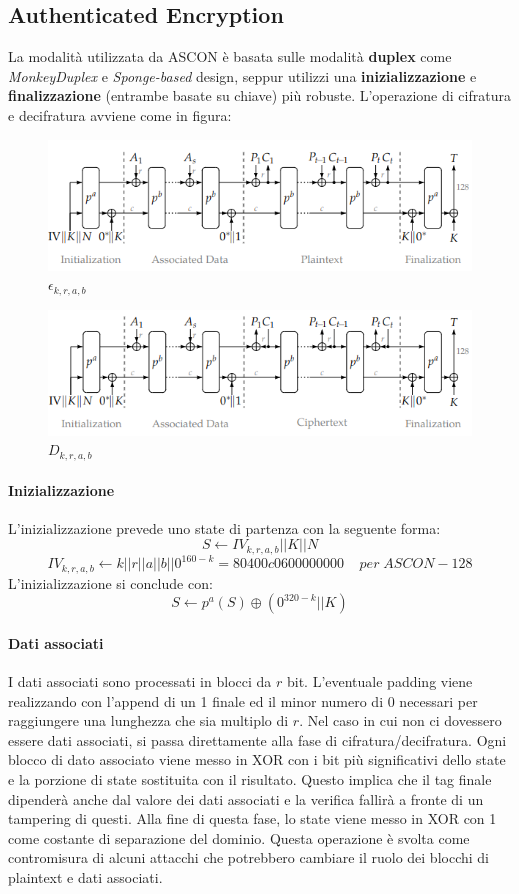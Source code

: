 \subsection{Authenticated Encryption}
La modalità utilizzata da ASCON è basata sulle modalità \textbf{duplex} come \textsl{MonkeyDuplex} e \textsl{Sponge-based} design, seppur utilizzi una \textbf{inizializzazione} e \textbf{finalizzazione} (entrambe basate su chiave) più robuste. L'operazione di cifratura e decifratura avviene come in figura: 
\begin{figure}[h!]
    \centering
    \includegraphics[width=12cm]{images/enc.png}
    \caption[short]{$\epsilon_{k,r,a,b}$}
\end{figure}
\begin{figure}[h!]
    \centering
    \includegraphics[width=12cm]{images/dec.png}
    \caption[short]{$D_{k,r,a,b}$}
\end{figure}
\paragraph*{Inizializzazione}
L'inizializzazione prevede uno state di partenza con la seguente forma: 
\[S \leftarrow IV_{k,r,a,b} || K || N\]
\[IV_{k,r,a,b} \leftarrow k || r || a || b || 0^{160-k} = 80400c0600000000\;\;\;\;per\;ASCON-128\]
L'inizializzazione si conclude con:
\[S\leftarrow p^a(S)\oplus (0^{320-k} || K)\]
\paragraph*{Dati associati}
I dati associati sono processati in blocci da $r$ bit. L'eventuale padding viene realizzando con l'append di un 1 finale ed il minor numero di 0 necessari per raggiungere una lunghezza che sia multiplo di $r$. Nel caso in cui non ci dovessero essere dati associati, si passa direttamente alla fase di cifratura/decifratura. Ogni blocco di dato associato viene messo in XOR con i bit più significativi dello state e la porzione di state sostituita con il risultato. Questo implica che il tag finale dipenderà anche dal valore dei dati associati e la verifica fallirà a fronte di un tampering di questi. 
\newline\newline
Alla fine di questa fase, lo state viene messo in XOR con 1 come costante di separazione del dominio. Questa operazione è svolta come contromisura di alcuni attacchi che potrebbero cambiare il ruolo dei blocchi di plaintext e dati associati. 
